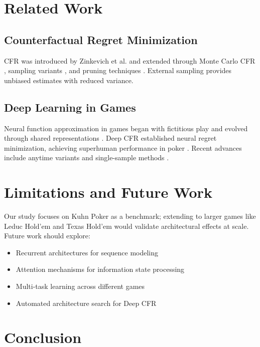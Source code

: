 \documentclass{article}
\begin{document}
\section{Related Work}

\subsection{Counterfactual Regret Minimization}

CFR was introduced by Zinkevich et al. \cite{zinkevich2007regret} and extended through Monte Carlo CFR \cite{lanctot2009monte}, sampling variants \cite{gibson2012efficient}, and pruning techniques \cite{lanctot2013efficient}. External sampling \cite{gibson2012efficient} provides unbiased estimates with reduced variance.

\subsection{Deep Learning in Games}

Neural function approximation in games began with fictitious play \cite{heinrich2015fictitious} and evolved through shared representations \cite{muller2019shared}. Deep CFR \cite{heinrich2016deep,brown2019deep} established neural regret minimization, achieving superhuman performance in poker \cite{brown2019superhuman}. Recent advances include anytime variants \cite{mcaleer2022anytime} and single-sample methods \cite{steinberger2019single}.

\section{Limitations and Future Work}

Our study focuses on Kuhn Poker as a benchmark; extending to larger games like Leduc Hold'em and Texas Hold'em would validate architectural effects at scale. Future work should explore:

\begin{itemize}
\item Recurrent architectures for sequence modeling
\item Attention mechanisms for information state processing
\item Multi-task learning across different games
\item Automated architecture search for Deep CFR
\end{itemize}

\section{Conclusion}
\end{document}
